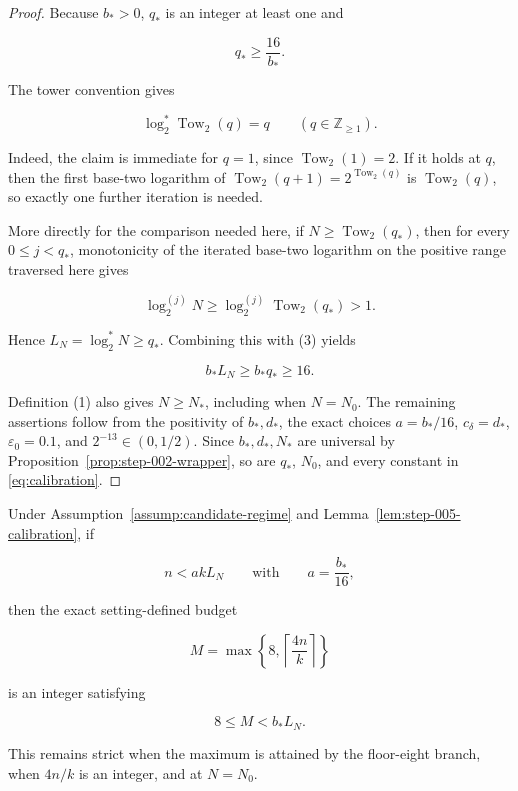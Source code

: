 \begin{proof}
Because \(b_*>0\), \(q_*\) is an integer at least one and

\[
q_*\ge\frac{16}{b_*}.
\tag{3}
\]

The tower convention gives

\[
\log_2^*\operatorname{Tow}_2(q)=q
\qquad(q\in\mathbb Z_{\ge1}).
\tag{4}
\]

Indeed, the claim is immediate for \(q=1\), since
\(\operatorname{Tow}_2(1)=2\). If it holds at \(q\), then the first
base-two logarithm of
\(\operatorname{Tow}_2(q+1)=2^{\operatorname{Tow}_2(q)}\) is
\(\operatorname{Tow}_2(q)\), so exactly one further iteration is needed.

More directly for the comparison needed here, if
\(N\ge\operatorname{Tow}_2(q_*)\), then for every
\(0\le j<q_*\), monotonicity of the iterated base-two logarithm on the
positive range traversed here gives

\[
\log_2^{(j)}N
\ge
\log_2^{(j)}\operatorname{Tow}_2(q_*)
>1.
\]

Hence \(L_N=\log_2^*N\ge q_*\). Combining this with (3) yields

\[
b_*L_N\ge b_*q_*\ge16.
\tag{5}
\]

Definition (1) also gives \(N\ge N_*\), including when \(N=N_0\).
The remaining assertions follow from the positivity of
\(b_*,d_*\), the exact choices
\(a=b_*/16\), \(c_\delta=d_*\), \(\varepsilon_0=0.1\), and
\(2^{-13}\in(0,1/2)\). Since \(b_*,d_*,N_*\) are universal by
Proposition~\ref{prop:step-002-wrapper},
so are \(q_*\), \(N_0\), and every constant in
\eqref{eq:calibration}. \end{proof}

\begin{lemma}\label{lem:step-005-budget}
Under Assumption~\ref{assump:candidate-regime} and
Lemma~\ref{lem:step-005-calibration}, if

\[
n<akL_N
\qquad\text{with}\qquad a=\frac{b_*}{16},
\]

then the exact setting-defined budget

\[
M=\max\left\{8,\left\lceil\frac{4n}{k}\right\rceil\right\}
\]

is an integer satisfying

\[
8\le M<b_*L_N.
\tag{6}
\]

This remains strict when the maximum is attained by the floor-eight
branch, when \(4n/k\) is an integer, and at \(N=N_0\).
\end{lemma}

